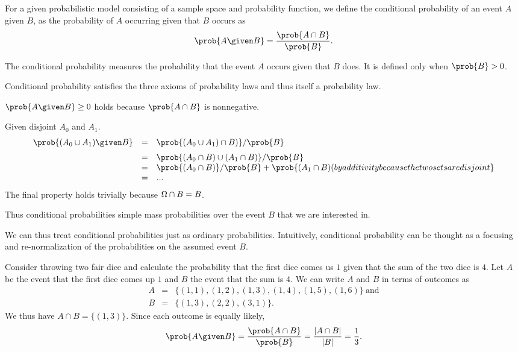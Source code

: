 {\begin{definition}
For a given probabilistic model consisting of a sample space and
probability function, we define the conditional probability of an
event $A$ given $B$, as the probability of $A$ occurring given that
$B$ occurs as 
\[
\prob{A \given B} = \frac{\prob{A \cap B}}{\prob{B}}. 
\]

The conditional probability measures the probability that the event
$A$ occurs given that $B$ does.  It is defined only when $\prob{B} > 0$.
\end{definition}

Conditional probability satisfies the three axioms of probability
laws and thus itself a probability law.
%
\begin{notesonly}
$\prob{A \given B} \ge 0$ holds because $\prob{A \cap B}$ is
nonnegative.

Given disjoint $A_0$ and $A_1$.
\[
\begin{array}{lll}

\prob{(A_0 \cup A_1) \given B} & = & \prob{(A_0 \cup A_1) \cap B)} /
\prob{B}
\\[2mm]
& = & \prob{(A_0 \cap B) \cup (A_1 \cap B)} / \prob{B}
\\
& = & \prob{(A_0 \cap B)} / \prob{B} +  \prob{(A_1 \cap B) \mbox(by
  additivity because the two sets are disjoint}
\\
& = & ...
\end{array}
\]
The final property holds trivially because $\Omega \cap B = B$. 

Thus conditional probabilities simple mass probabilities over the
event $B$ that we are interested in. 

\end{notesonly}

%
We can thus treat conditional probabilities just as ordinary
probabilities.  Intuitively, conditional probability can be thought as
a focusing and re-normalization of the probabilities on the
assumed event $B$.
%


\begin{example}
Consider throwing two fair dice and calculate the probability that the
first dice comes us $1$ given that the sum of the two dice is $4$. 
%
Let $A$ be the event  that the first dice comes up $1$ and $B$ the
event that the sum is $4$.
%
We can write $A$ and $B$ in terms of outcomes as 
\[
\begin{array}{lll}
A & = & \{ (1,1), (1,2), (1,3), (1,4), (1,5), (1,6) \}~\mbox{and}
\\
B & = & \{ (1,3), (2,2), (3,1) \}.
\end{array}
\]
We thus have $A \cap B = \{ (1,3) \}$.
%
Since each outcome is equally likely, 
\[
\prob{A \given B} = \frac{\prob{A \cap B}}{\prob{B}} 
%
= 
%
\frac{|A \cap B|}{|B|} = \frac{1}{3}.
\]
\end{example}

}
